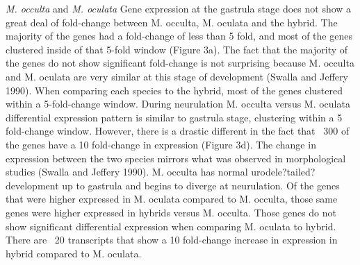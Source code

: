 \textit{M. occulta} and \textit{M. oculata} Gene expression at the gastrula stage does not show a great deal of fold-change between M. occulta, M. oculata and the hybrid. The majority of the genes had a fold-change of less than 5 fold, and most of the genes clustered inside of that 5-fold window (Figure 3a).  The fact that the majority of the genes do not show significant fold-change is not surprising because M. occulta and M. oculata are very similar at this stage of development (Swalla and Jeffery 1990).  When comparing each species to the hybrid, most of the genes clustered within a 5-fold-change window. 
During neurulation M. occulta versus M. oculata differential expression pattern is similar to gastrula stage, clustering within a 5 fold-change window. However, there is a drastic different in the fact that ~300 of the genes have a 10 fold-change in expression (Figure 3d).  The change in expression between the two species mirrors what was observed in morphological studies (Swalla and Jeffery 1990). M. occulta has normal urodele?tailed?development up to gastrula and begins to diverge at neurulation. Of the genes that were higher expressed in M. oculata compared to M. occulta, those same genes were higher expressed in hybrids versus M. occulta. Those genes do not show significant differential expression when comparing M. oculata to hybrid. There are ~20 transcripts that show a 10 fold-change increase in expression in hybrid compared to M. oculata.

